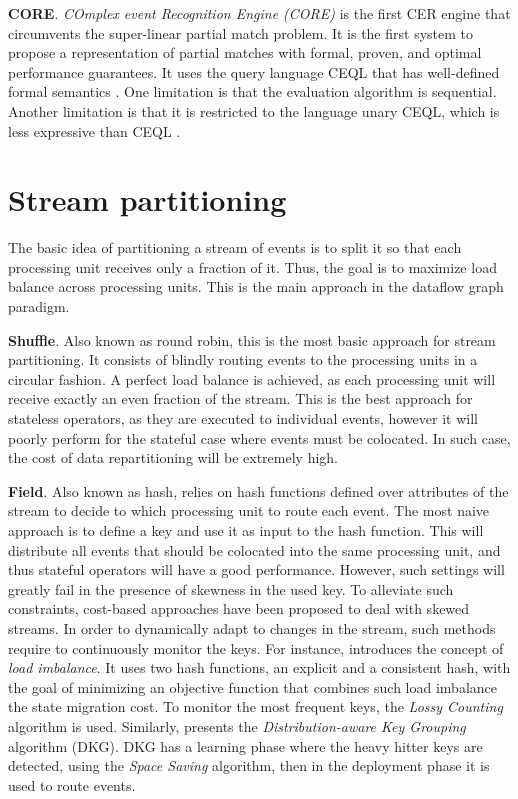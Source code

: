 \textbf{CORE}. \emph{COmplex event Recognition Engine (CORE)} \cite{core} is the first CER engine that circumvents the super-linear partial match problem. It is the first system to propose a representation of partial matches with formal, proven, and optimal performance guarantees. It uses the query language CEQL that has well-defined formal semantics \cite{on-the-expressiveness}. One limitation is that the evaluation algorithm is sequential. Another limitation is that it is restricted to the language unary CEQL, which is less expressive than CEQL \cite{on-the-expressiveness}.

\section{Stream partitioning}\label{sec:stream-partitioning}

The basic idea of partitioning a stream of events is to split it so that each processing unit receives only a fraction of it. Thus, the goal is to maximize load balance across processing units. This is the main approach in the dataflow graph paradigm.

\textbf{Shuffle}. Also known as round robin, this is the most basic approach for stream partitioning. It consists of blindly routing events to the processing units in a circular fashion. A perfect load balance is achieved, as each processing unit will receive exactly an even fraction of the stream. This is the best approach for stateless operators, as they are executed to individual events, however it will poorly perform for the stateful case where events must be colocated. In such case, the cost of data repartitioning will be extremely high.

\textbf{Field}. Also known as hash, relies on hash functions defined over attributes of the stream to decide to which processing unit to route each event. The most naive approach is to define a key and use it as input to the hash function. This will distribute all events that should be colocated into the same processing unit, and thus stateful operators will have a good performance. However, such settings will greatly fail in the presence of skewness in the used key. To alleviate such constraints, cost-based approaches have been proposed to deal with skewed streams. In order to dynamically adapt to changes in the stream, such methods require to continuously monitor the keys. For instance, \cite{DBLP:journals/vldb/Gedik14} introduces the concept of \textit{load imbalance}. It uses two hash functions, an explicit and a consistent hash, with the goal of minimizing an objective function that combines such load imbalance the state migration cost. To monitor the most frequent keys, the \textit{Lossy Counting} algorithm is used. Similarly, \cite{DBLP:conf/debs/RivettiQABS15} presents the \textit{Distribution-aware Key Grouping} algorithm (DKG). DKG has a learning phase where the heavy hitter keys are detected, using the \textit{Space Saving} algorithm, then in the deployment phase it is used to route events.

